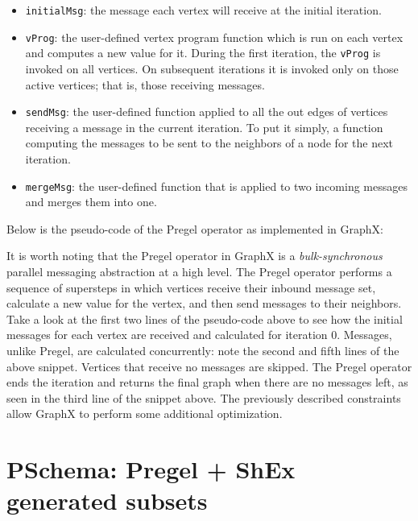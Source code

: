 \begin{itemize}
    \itemsep0.5em
    \item \texttt{initialMsg}: the message each vertex will receive at the initial iteration.
    \item \texttt{vProg}: the user-defined vertex program function which is run on each vertex and computes a new value for it. During the first iteration, the \texttt{vProg} is invoked on all vertices. On subsequent iterations it is invoked only on those active vertices; that is, those receiving messages.
    \item \texttt{sendMsg}: the user-defined function applied to all the out edges of vertices receiving a message in the current iteration. To put it simply, a function computing the messages to be sent to the neighbors of a node for the next iteration.
    \item \texttt{mergeMsg}: the user-defined function that is applied to two incoming messages and merges them into one.
\end{itemize}

Below is the pseudo-code of the Pregel operator as implemented in GraphX:

\begin{pseudocode}
    
\end{pseudocode}

It is worth noting that the Pregel operator in GraphX is a \textit{bulk-synchronous} parallel messaging abstraction at a high level. The Pregel operator performs a sequence of supersteps in which vertices receive their inbound message set, calculate a new value for the vertex, and then send messages to their neighbors. Take a look at the first two lines of the pseudo-code above to see how the initial messages for each vertex are received and calculated for iteration 0. Messages, unlike Pregel, are calculated concurrently: note the second and fifth lines of the above snippet. Vertices that receive no messages are skipped. The Pregel operator ends the iteration and returns the final graph when there are no messages left, as seen in the third line of the snippet above. The previously described constraints allow GraphX to perform some additional optimization.

\section{PSchema: Pregel + ShEx generated subsets}

